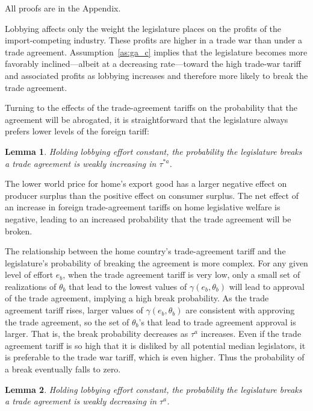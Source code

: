 \documentclass[10pt]{article}
\newtheorem{lemma}{Lemma}
\newcommand{\ta}{\theta}
\newcommand{\ga}{\gamma}
\begin{document}
\noindent All proofs are in the Appendix.

Lobbying affects only the weight the legislature places on the profits of the import-competing industry. These profits are higher in a trade war than under a trade agreement. Assumption~\ref{as:ga_c} implies that the legislature becomes more favorably inclined---albeit at a decreasing rate---toward the high trade-war tariff and associated profits as lobbying increases and therefore more likely to break the trade agreement. 

Turning to the effects of the trade-agreement tariffs on the probability that the agreement will be abrogated, it is straightforward that the legislature always prefers lower levels of the foreign tariff:
\begin{lemma}
  Holding lobbying effort constant, the probability the legislature breaks a trade agreement is weakly increasing in $\tau^{*a}$.
  \label{lem:leg_astar}
\end{lemma}

The lower world price for home's export good has a larger negative effect on producer surplus than the positive effect on consumer surplus. The net effect of an increase in foreign trade-agreement tariffs on home legislative welfare is negative, leading to an increased probability that the trade agreement will be broken.

The relationship between the home country's trade-agreement tariff and the legislature's probability of breaking the agreement is more complex. For any given level of effort $e_b$, when the trade agreement tariff is very low, only a small set of realizations of $\ta_b$ that lead to the lowest values of $\ga(e_b,\ta_b)$ will lead to approval of the trade agreement, implying a high break probability. As the trade agreement tariff rises, larger values of $\ga(e_b,\ta_b)$ are consistent with approving the trade agreement, so the set of $\ta_b$'s that lead to trade agreement approval is larger. That is, the break probability decreases as $\tau^a$ increases. Even if the trade agreement tariff is so high that it is disliked by all potential median legislators, it is preferable to the trade war tariff, which is even higher. Thus the probability of a break eventually falls to zero.

\begin{lemma}
  Holding lobbying effort constant, the probability the legislature breaks a trade agreement is weakly decreasing in $\tau^a$.
  \label{res:leg_a}
\end{lemma}
\end{document}
